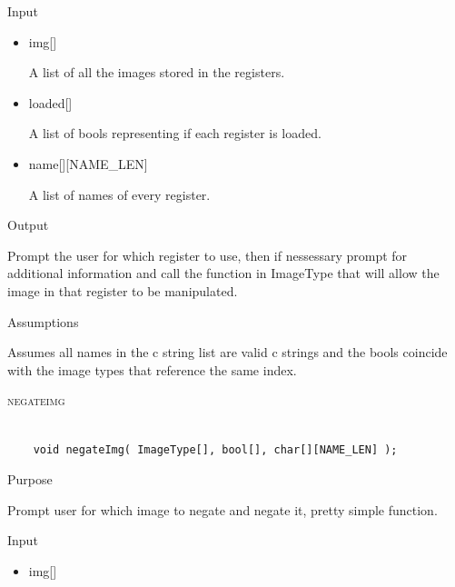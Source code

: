 \documentclass[pdftex, 11pt]{article}
\begin{document}
\begin{description}
\begin{description}
			\item{Input}

				\begin{itemize}

					\item{img[]}

						A list of all the images stored in the registers.

					\item{loaded[]}

						A list of bools representing if each register is loaded.

					\item{name[][NAME\_LEN]}

						A list of names of every register.

				\end{itemize}

			\item{Output}

				Prompt the user for which register to use, then if nessessary
				prompt for additional information and call the function
				in ImageType that will allow the image in that register to
				be manipulated.

			\item{Assumptions}

				Assumes all names in the c string list are valid c
				strings and the bools coincide with the image types that
				reference the same index.

		\end{description}



	\item{\textsc{negateimg}}

		\begin{lstlisting}

	void negateImg( ImageType[], bool[], char[][NAME_LEN] );
		\end{lstlisting}

		\begin{description}
			\item{Purpose}

				Prompt user for which image to negate and negate it, pretty simple function.

			\item{Input}

				\begin{itemize}

					\item{img[]}


\end{itemize}
\end{description}
\end{description}
\end{document}
